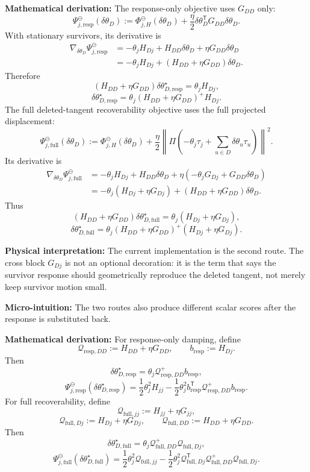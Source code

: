 \documentclass[10pt,twocolumn]{article}
\newcommand{\blocktitle}[1]{\vspace{2pt}\noindent\textbf{#1}\space}
\newcommand{\micro}[1]{\blocktitle{Micro-intuition:} #1}
\newcommand{\deriv}{\blocktitle{Mathematical derivation:}}
\newcommand{\phys}[1]{\blocktitle{Physical interpretation:} #1}
\begin{document}
\deriv
The response-only objective uses \(G_{DD}\) only:
\[
\Psi_{j,\mathrm{resp}}^\ominus(\delta\theta_D)
:=
\Phi_{j,H}^\ominus(\delta\theta_D)
+
\frac{\eta}{2}
\delta\theta_D^{\mathsf T}G_{DD}\delta\theta_D.
\]
With stationary survivors, its derivative is
\[
\begin{aligned}
\nabla_{\delta\theta_D}\Psi_{j,\mathrm{resp}}^\ominus
&=
-\theta_jH_{Dj}
+
H_{DD}\delta\theta_D
+
\eta G_{DD}\delta\theta_D
\\
&=
-\theta_jH_{Dj}
+
(H_{DD}+\eta G_{DD})\delta\theta_D .
\end{aligned}
\]
Therefore
\[
(H_{DD}+\eta G_{DD})
\delta\theta_{D,\mathrm{resp}}^\star
=
\theta_jH_{Dj},
\]
\[
\boxed{
\delta\theta_{D,\mathrm{resp}}^\star
=
\theta_j
(H_{DD}+\eta G_{DD})^+H_{Dj}.
}
\]
The full deleted-tangent recoverability objective uses the full projected displacement:
\[
\Psi_{j,\mathrm{full}}^\ominus(\delta\theta_D)
:=
\Phi_{j,H}^\ominus(\delta\theta_D)
+
\frac{\eta}{2}
\left\|
\Pi\left(
-\theta_j\tau_j+\sum_{u\in D}\delta\theta_u\tau_u
\right)
\right\|^2 .
\]
Its derivative is
{\small
\[
\begin{aligned}
\nabla_{\delta\theta_D}\Psi_{j,\mathrm{full}}^\ominus
&=
-\theta_jH_{Dj}
+
H_{DD}\delta\theta_D
+
\eta(-\theta_jG_{Dj}+G_{DD}\delta\theta_D)
\\
&=
-\theta_j(H_{Dj}+\eta G_{Dj})
+
(H_{DD}+\eta G_{DD})\delta\theta_D .
\end{aligned}
\]
}
Thus
\[
(H_{DD}+\eta G_{DD})
\delta\theta_{D,\mathrm{full}}^\star
=
\theta_j(H_{Dj}+\eta G_{Dj}),
\]
\[
\boxed{
\delta\theta_{D,\mathrm{full}}^\star
=
\theta_j
(H_{DD}+\eta G_{DD})^+
(H_{Dj}+\eta G_{Dj}).
}
\]

\phys{The current implementation is the second route. The cross block \(G_{Dj}\) is not an optional decoration: it is the term that says the survivor response should geometrically reproduce the deleted tangent, not merely keep survivor motion small.}

\micro{The two routes also produce different scalar scores after the response is substituted back.}

\deriv
For response-only damping, define
\[
\mathcal Q_{\mathrm{resp},DD}:=H_{DD}+\eta G_{DD},
\qquad
b_{\mathrm{resp}}:=H_{Dj}.
\]
Then
\[
\delta\theta_{D,\mathrm{resp}}^\star
=
\theta_j \mathcal Q_{\mathrm{resp},DD}^+b_{\mathrm{resp}},
\]
\[
\Psi_{j,\mathrm{resp}}^\ominus(\delta\theta_{D,\mathrm{resp}}^\star)
=
\frac12\theta_j^2H_{jj}
-
\frac12\theta_j^2
b_{\mathrm{resp}}^{\mathsf T}
\mathcal Q_{\mathrm{resp},DD}^{+}
b_{\mathrm{resp}} .
\]
For full recoverability, define
\[
\mathcal Q_{\mathrm{full},jj}:=H_{jj}+\eta G_{jj},
\]
\[
\mathcal Q_{\mathrm{full},Dj}:=H_{Dj}+\eta G_{Dj},
\qquad
\mathcal Q_{\mathrm{full},DD}:=H_{DD}+\eta G_{DD}.
\]
Then
\[
\delta\theta_{D,\mathrm{full}}^\star
=
\theta_j\mathcal Q_{\mathrm{full},DD}^+\mathcal Q_{\mathrm{full},Dj},
\]
\[
\Psi_{j,\mathrm{full}}^\ominus(\delta\theta_{D,\mathrm{full}}^\star)
=
\frac12\theta_j^2\mathcal Q_{\mathrm{full},jj}
-
\frac12\theta_j^2
\mathcal Q_{\mathrm{full},Dj}^{\mathsf T}
\mathcal Q_{\mathrm{full},DD}^{+}
\mathcal Q_{\mathrm{full},Dj}.
\]
\end{document}
